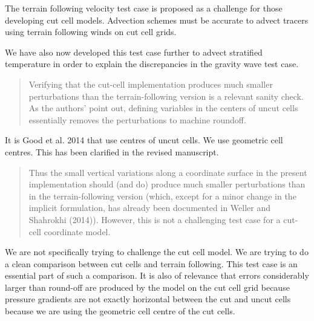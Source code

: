 \documentclass{article}
\begin{document}
The terrain following velocity test case is proposed as a challenge for those developing cut cell models. Advection schemes must be accurate to advect tracers using terrain following winds on cut cell grids. 

We have also now developed this test case further to advect stratified temperature in order to explain the discrepancies in the gravity wave test case. 

\begin{quotation}
Verifying that the cut-cell implementation produces much smaller 
perturbations than the terrain-following version is a relevant
sanity check. As the authors' point out, defining variables in the
centers of uncut cells essentially removes the perturbations to
machine roundoff.
\end{quotation}
It is Good et al. 2014 that use centres of uncut cells.  We use geometric cell centres.  This has been clarified in the revised manuscript.

\begin{quotation}
Thus the small vertical variations along a coordinate surface in the 
present implementation should (and do) produce much smaller 
perturbations than in the terrain-following version (which, except
for a minor change in the implicit formulation, has already been
documented in Weller and Shahrokhi (2014)). However, this is not a
challenging test case for a cut-cell coordinate model.
\end{quotation}
We are not specifically trying to challenge the cut cell model. We are trying to do a clean comparison between cut cells and terrain following. This test case is an essential part of such a comparison. It is also of relevance that errors considerably larger than round-off are produced by the model on the cut cell grid because pressure gradients are not exactly horizontal between the cut and uncut cells because we are using the geometric cell centre of the cut cells. 
\end{document}
